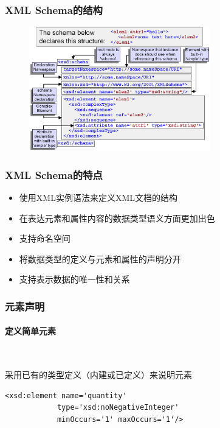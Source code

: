 \subsubsection{XML Schema的结构}
\begin{figure}[H]
    \vspace{-0.5em}
	\centering
	\includegraphics[width=0.7\textwidth]{images/XML Schema的结构.png}
    \vspace{-2em}
\end{figure}


\subsubsection{XML Schema的特点}
\vspace{-0.8em}
\begin{multicols}{2}
	\begin{itemize}
		\item 使用XML实例语法来定义XML文档的结构
		\item 在表达元素和属性内容的数据类型语义方面更加出色
		\item 支持命名空间
		\item 将数据类型的定义与元素和属性的声明分开
		\item 支持表示数据的唯一性和关系
	\end{itemize}
\end{multicols}
\vspace{-1em}


\subsubsection{元素声明}
\paragraph*{定义简单元素}~{} \par
采用已有的类型定义（内建或已定义）来说明元素
\begin{lstlisting}
<xsd:element name='quantity'
			type='xsd:noNegativeInteger'
			minOccurs='1' maxOccurs='1'/>
\end{lstlisting}

